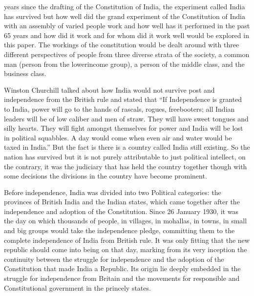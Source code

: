 \setcounter{figure}{0}
\setcounter{table}{0}
\setcounter{footnote}{0}

\label{2016-art4}



\begin{multicols}{2}


 years since the drafting of the Constitution of India, the experiment called India has survived but how well did the grand experiment of the Constitution of India with an assembly of varied people work and how well has it performed in the past 65 years and how did it work and for whom did it work well would be explored in this paper. The workings of the constitution would be dealt around with three different perspectives of people from three diverse strata of the society, a common man (person from the lowerincome group), a person of the middle class, and the business class.

\noi
Winston Churchill talked about how India would not survive post and independence from the British rule and stated that “If Independence is granted to India, power will go to the hands of rascals, rogues, freebooters; all Indian leaders will be of low caliber and men of straw. They will have sweet tongues and silly hearts. They will fight amongst themselves for power and India will be lost in political squabbles. A day would come when even air and water would be taxed in India.” But the fact is there is a country called India still existing. So the nation has survived but it is not purely attributable to just political intellect, on the contrary, it was the judiciary that has held the country together though with some decisions the divisions in the country have become prominent.

\noi
Before independence, India was divided into two Political categories: the provinces of British India and the Indian states, which came together after the independence and adoption of the Constitution. Since 26 January 1930, it was the day on which thousands of people, in villages, in mohallas, in towns, in small and big groups would take the independence pledge, committing them to the complete independence of India from British rule. It was only fitting that the new republic should come into being on that day, marking from its very inception the continuity between the struggle for independence and the adoption of the Constitution that made India a Republic. Its origin lie deeply embedded in the struggle for independence from Britain and the movements for responsible and Constitutional government in the princely states.


\end{multicols}
